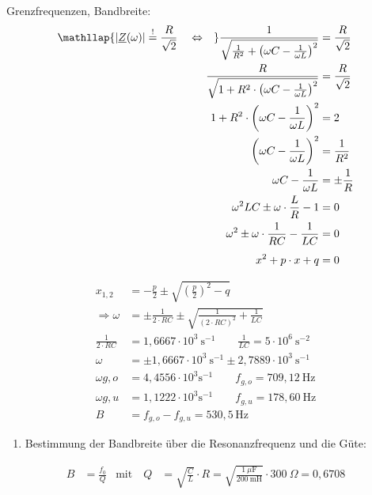 {Grenzfrequenzen, Bandbreite:
\begin{align*}
    \mathllap{|\underline{Z}(\omega)| \overset{!}{=} \frac{R}{\sqrt{2}} \quad \Leftrightarrow \quad}
    \frac{1}{\sqrt{\frac{1}{R^2} + \left(\omega C - \frac{1}{\omega L}\right)^2}} &= \frac{R}{\sqrt{2}} \\
    \frac{R}{\sqrt{1 + R^2\cdot\left(\omega C - \frac{1}{\omega L}\right)^2}} &= \frac{R}{\sqrt{2}} \\
    1 + R^2\cdot\left(\omega C - \frac{1}{\omega L}\right)^2 &= 2 \\
    \left(\omega C - \frac{1}{\omega L}\right)^2 &= \frac{1}{R^2} \\
    \omega C - \frac{1}{\omega L} &= \pm\frac{1}{R} \\
    \omega^2 LC \pm \omega \cdot \frac{L}{R} - 1 &= 0 \\
    \omega^2 \pm \omega \cdot \frac{1}{RC} - \frac{1}{LC} &= 0 \\
    x^2 + p \cdot x + q &= 0 \vphantom{\frac{1}{LC}}%
\end{align*}
\begin{align*}
    x_{1,2} &= -\frac{p}{2} \pm \sqrt{\left(\frac{p}{2}\right)^2 - q} \\ %
    \Rightarrow \omega &= \pm \frac{1}{2 \cdot RC} \pm \sqrt{\frac{1}{(2 \cdot RC)^2} + \frac{1}{LC}}\\
    \frac{1}{2 \cdot RC} &= 1,6667 \cdot 10^3\ \mathrm{s}^{-1} \qquad
    \frac{1}{LC} = 5 \cdot 10^6\ \mathrm{s}^{-2} \\[4pt]
    \omega &= \pm 1,6667 \cdot 10^3\ \mathrm{s}^{-1} \pm 2,7889 \cdot 10^3\ \mathrm{s}^{-1} \\[4pt]
    \omega{g,o} &= 4,4556 \cdot 10^3 \mathrm{s}^{-1} \qquad f_{g,o} = 709,12\ \mathrm{Hz}\\
    \omega{g,u} &= 1,1222 \cdot 10^3 \mathrm{s}^{-1} \qquad f_{g,u} = 178,60\ \mathrm{Hz}\\[4pt]
    B &= f_{g,o} - f_{g,u} = 530,5\,\mathrm{Hz}
\end{align*}
\begin{enumerate}
    \item[d)] Bestimmung der Bandbreite über die Resonanzfrequenz und die Güte:
\end{enumerate}\vspace{-0.5cm}
\begin{align*}
    B &= \frac{f_0}{Q}
        & \text{mit}\quad Q &= \sqrt{\frac{C}{L}}\cdot R = \sqrt{\frac{1\ \mu\mathrm{F}}{200\ \mathrm{mH}}} \cdot 300\ \Omega = 0,6708 \\

\end{align*}}
